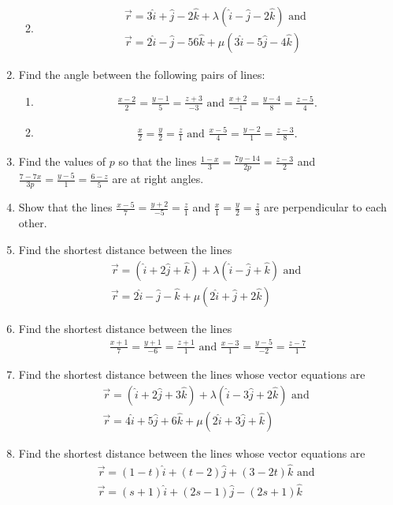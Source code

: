 \documentclass{article}                                                                              \usepackage{cite}
\theoremstyle{remark}
\begin{document}
\begin{enumerate}
\begin{enumerate}[label=(\roman*)]
\begin{align}
\end{align} 
\item 
\begin{align}
\overrightarrow{r}=3\hat{i}+\hat{j}-2\hat{k}+\lambda(\hat{i}-\hat{j}-2\hat{k}) \text{ and }\\ \overrightarrow{r}=2\hat{i}-\hat{j}-56\hat{k}+\mu(3\hat{i}-5\hat{j}-4\hat{k})
\end{align}
\end{enumerate}
\item Find the angle between the following pairs of lines:
\begin{enumerate}[label=(\roman*)]
\item 
\begin{align} \frac{x-2}{2}=\frac{y-1}{5}=\frac{z+3}{-3}\text{ and } \frac{x+2}{-1}=\frac{y-4}{8}=\frac{z-5}{4}.
\end{align}
\item
\begin{align} \frac{x}{2}=\frac{y}{2}=\frac{z}{1}\text{ and } \frac{x-5}{4}=\frac{y-2}{1}=\frac{z-3}{8}.
\end{align}
\end{enumerate}
\item Find the values of $p$ so that the lines $ \frac{1-x}{3}=\frac{7y-14}{2p}=\frac{z-3}{2}$ and $ \frac{7-7x}{3p}=\frac{y-5}{1}=\frac{6-z}{5}$ are at right angles.
\item Show that the lines $ \frac{x-5}{7}=\frac{y+2}{-5}=\frac{z}{1}$ and $ \frac{x}{1}=\frac{y}{2}=\frac{z}{3}$ are perpendicular to each other.
\item Find the shortest distance between the lines
\begin{align}
\overrightarrow{r}=(\hat{i}+2\hat{j}+\hat{k})+\lambda(\hat{i}-\hat{j}+\hat{k})\text{ and }\\ \overrightarrow{r}=2\hat{i}-\hat{j}-\hat{k}+\mu(2\hat{i}+\hat{j}+2\hat{k})
\end{align}
\item Find the shortest distance between the lines
\begin{align}
 \frac{x+1}{7}=\frac{y+1}{-6}=\frac{z+1}{1}\text{ and } \frac{x-3}{1}=\frac{y-5}{-2}=\frac{z-7}{1}
\end{align} 
\item Find the shortest distance between the lines whose vector equations are
\begin{align} 
\overrightarrow{r}=(\hat{i}+2\hat{j}+3\hat{k})+\lambda(\hat{i}-3\hat{j}+2\hat{k})\text{ and }\\ \overrightarrow{r}=4\hat{i}+5\hat{j}+6\hat{k}+\mu(2\hat{i}+3\hat{j}+\hat{k})
\end{align}
\item Find the shortest distance between the lines whose vector equations are 
\begin{align} 
\overrightarrow{r}=(1-t)\hat{i}+(t-2)\hat{j}+(3-2t)\hat{k} \text{ and }\\ \overrightarrow{r}=(s+1)\hat{i}+(2s-1)\hat{j}-(2s+1)\hat{k}
\end{align}
\end{enumerate}
\end{document}
